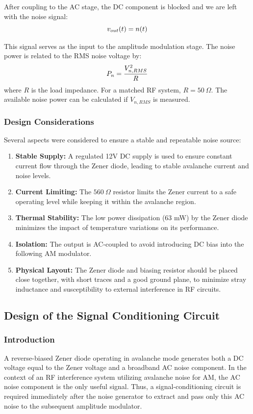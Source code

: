 \documentclass[12pt,a4paper]{report}
\begin{document}
	After coupling to the AC stage, the DC component is blocked and we are left with the noise signal:
	\begingroup
	\setlength{\mathindent}{0pt}
	\begin{equation*}
		\hfill
		v_{out}(t) = n(t)
		\hfill
	\end{equation*}
	\endgroup
	
	This signal serves as the input to the amplitude modulation stage. The noise power is related to the RMS noise voltage by:
	\begingroup
	\setlength{\mathindent}{0pt}
	\begin{equation*}
		\hfill
		P_n = \frac{V_{n,RMS}^2}{R}
		\hfill
	\end{equation*}
	\endgroup
	where $R$ is the load impedance. For a matched RF system, $R = 50\ \Omega$. The available noise power can be calculated if $V_{n,RMS}$ is measured.
	
	\subsubsection{Design Considerations}
	Several aspects were considered to ensure a stable and repeatable noise source:
	\begin{enumerate}
		\item \textbf{Stable Supply:} A regulated 12V DC supply is used to ensure constant current flow through the Zener diode, leading to stable avalanche current and noise levels.
		\item \textbf{Current Limiting:} The $560\ \Omega$ resistor limits the Zener current to a safe operating level while keeping it within the avalanche region.
		\item \textbf{Thermal Stability:} The low power dissipation (63 mW) by the Zener diode minimizes the impact of temperature variations on its performance.
		\item \textbf{Isolation:} The output is AC-coupled to avoid introducing DC bias into the following AM modulator.
		\item \textbf{Physical Layout:} The Zener diode and biasing resistor should be placed close together, with short traces and a good ground plane, to minimize stray inductance and susceptibility to external interference in RF circuits.
	\end{enumerate}
	\subsection{Design of the Signal Conditioning Circuit}
	
	\subsubsection{Introduction}
	A reverse-biased Zener diode operating in avalanche mode generates both a DC voltage equal to the Zener voltage and a broadband AC noise component. In the context of an RF interference system utilizing avalanche noise for AM, the AC noise component is the only useful signal. Thus, a signal-conditioning circuit is required immediately after the noise generator to extract and pass only this AC noise to the subsequent amplitude modulator.
	
\end{document}
